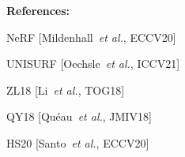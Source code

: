 \documentclass[landscape,a0paper,fontscale=0.292]{baposter}
\begin{document}
\begin{poster}
{\begin{minipage}[t]{0.49\textwidth}
\begin{minipage}[t]{0.58\textwidth}
\begin{center}
        \end{center}
        \end{minipage}\hfill
        \begin{minipage}[t]{0.4\textwidth}
        \textbf{\color{ctitle}References:} \\
            \vspace{-0.8em}
            \begin{enumerate}[label={[\arabic*]}, leftmargin=*]
                \scriptsize
                \item NeRF [Mildenhall~\emph{et al.}, ECCV20]
                \item UNISURF [Oechsle~\emph{et al.}, ICCV21]
                \item ZL18 [Li~\emph{et al.}, TOG18]
                \item QY18 [Quéau~\emph{et al.}, JMIV18]
                \item HS20 [Santo~\emph{et al.}, ECCV20]
            \end{enumerate}
        \end{minipage}
    \end{minipage}

}
\end{poster}
\end{document}
